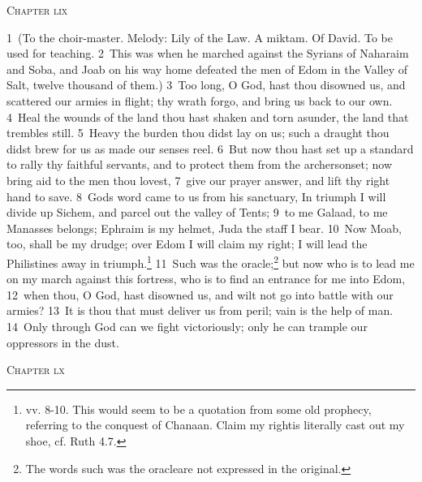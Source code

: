 \documentclass[10pt]{book} %
\begin{document}
\begin{large}\begin{center}\textsc{Chapter lix}\end{center}\end{large}
\textcolor{benred8}{1}~(To the choir-master. Melody: Lily of the Law. A miktam. Of David. To be used for teaching. \textcolor{benred8}{2}~This was when he marched against the Syrians of Naharaim and Soba, and Joab on his way home defeated the men of Edom in the Valley of Salt, twelve thousand of them.)
\textcolor{benred8}{3}~Too long, O God, hast thou disowned us, and scattered our armies in flight; thy wrath forgo, and bring us back to our own. \textcolor{benred8}{4}~Heal the wounds of the land thou hast shaken and torn asunder, the land that trembles still. \textcolor{benred8}{5}~Heavy the burden thou didst lay on us; such a draught thou didst brew for us as made our senses reel. \textcolor{benred8}{6}~But now thou hast set up a standard to rally thy faithful servants, and to protect them from the archers\textquotesingle  onset; now bring aid to the men thou lovest, \textcolor{benred8}{7}~give our prayer answer, and lift thy right hand to save.
\textcolor{benred8}{8}~God\textquotesingle s word came to us from his sanctuary, In triumph I will divide up Sichem, and parcel out the valley of Tents; \textcolor{benred8}{9}~to me Galaad, to me Manasses belongs; Ephraim is my helmet, Juda the staff I bear. \textcolor{benred8}{10}~Now Moab, too, shall be my drudge; over Edom I will claim my right; I will lead the Philistines away in triumph.\footnote[1]{vv. 8-10. This would seem to be a quotation from some old prophecy, referring to the conquest of Chanaan. \textasciigrave Claim my right\textquotesingle  is literally \textasciigrave cast out my shoe\textquotesingle , cf. Ruth 4.7.} \textcolor{benred8}{11}~Such was the oracle;\footnote[2]{The words \textasciigrave such was the oracle\textquotesingle  are not expressed in the original.} but now who is to lead me on my march against this fortress, who is to find an entrance for me into Edom, \textcolor{benred8}{12}~when thou, O God, hast disowned us, and wilt not go into battle with our armies? \textcolor{benred8}{13}~It is thou that must deliver us from peril; vain is the help of man. \textcolor{benred8}{14}~Only through God can we fight victoriously; only he can trample our oppressors in the dust.
\begin{large}\begin{center}\textsc{Chapter lx}\end{center}\end{large}
\end{document}
